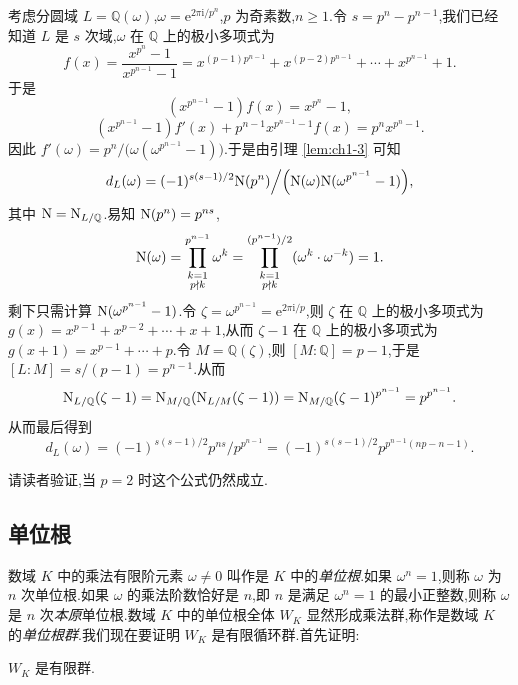 \begin{example}\label{ex:ch1-1-4}
考虑分圆域 $L=\mathbb{Q}(\omega)$,$\omega=\mathrm{e}^{2\pi\mathrm{i}/p^n}$,$p$ 为奇素数,$n\geqslant 1$.令 $s=p^n-p^{n-1}$,我们已经知道 $L$ 是 $s$ 次域,$\omega$ 在 $\mathbb{Q}$ 上的极小多项式为
\[
  f(x)=\frac{x^{p^n}-1}{x^{p^{n-1}}-1}=x^{(p-1)p^{n-1}}+x^{(p-2)p^{n-1}}+\cdots+x^{p^{n-1}}+1.
\]
于是
\[
  (x^{p^{n-1}}-1)f(x)=x^{p^n}-1,
\]
\[
  (x^{p^{n-1}}-1)f'(x)+p^{n-1}x^{p^{n-1}-1}f(x)=p^nx^{p^n-1}.
\]
因此 $f'(\omega)=p^n/\big(\omega(\omega^{p^{n-1}}-1)\big)$.于是由引理 \ref{lem:ch1-3} 可知
\[
  d_L(\omega)=(-1)^{s(s-1)/2}\mathrm{N}(p^n)\Big/\Big(\mathrm{N}(\omega)\mathrm{N}(\omega^{p^{n-1}}-1)\Big),
\]
其中 $\mathrm{N}=\mathrm{N}_{L/\mathbb{Q}}$.易知 $\mathrm{N}(p^n)=p^{ns}$,
\[
  \mathrm{N}(\omega)=\prod_{\substack{k=1\\ p\nmid k}}^{p^{n-1}}\omega^k=\prod_{\substack{k=1\\ p\nmid k}}^{(p^{n-1})/2}(\omega^k\cdot\omega^{-k})=1.
\]
剩下只需计算 $\mathrm{N}(\omega^{p^{n-1}}-1)$.令 $\zeta=\omega^{p^{n-1}}=\mathrm{e}^{2\pi\mathrm{i}/p}$,则 $\zeta$ 在 $\mathbb{Q}$ 上的极小多项式为 $g(x)=x^{p-1}+x^{p-2}+\cdots+x+1$,从而 $\zeta-1$ 在 $\mathbb{Q}$ 上的极小多项式为 $g(x+1)=x^{p-1}+\cdots+p$.令 $M=\mathbb{Q}(\zeta)$,则 $[M:\mathbb{Q}]=p-1$,于是 $[L:M]=s/(p-1)=p^{n-1}$.从而
\[
  \mathrm{N}_{L/\mathbb{Q}}(\zeta-1)=\mathrm{N}_{M/\mathbb{Q}}(\mathrm{N}_{L/M}(\zeta-1))
  =\mathrm{N}_{M/\mathbb{Q}}(\zeta-1)^{p^{n-1}}
  =p^{p^{n-1}}.
\]
从而最后得到
\[
  d_L(\omega)=(-1)^{s(s-1)/2}p^{ns}\big/p^{p^{n-1}}
  =(-1)^{s(s-1)/2}p^{p^{n-1}(np-n-1)}.
\]
\end{example}

请读者验证,当 $p=2$ 时这个公式仍然成立.

\subsection{单位根}\label{sec:ch1-s1-5}

数域 $K$ 中的乘法有限阶元素 $\omega\neq 0$ 叫作是 $K$ 中的\emph{单位根}.如果 $\omega^n=1$,则称 $\omega$ 为 $n$ 次单位根.如果 $\omega$ 的乘法阶数恰好是 $n$,即 $n$ 是满足 $\omega^n=1$ 的最小正整数,则称 $\omega$ 是 $n$ 次\emph{本原}单位根.数域 $K$ 中的单位根全体 $W_K$ 显然形成乘法群,称作是数域 $K$ 的\emph{单位根群}.我们现在要证明 $W_K$ 是有限循环群.首先证明:

\begin{lemma}\label{lem:ch1-4}
$W_K$ 是有限群.
\end{lemma}


